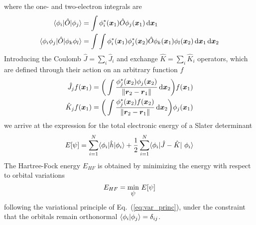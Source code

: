 where the one- and two-electron integrals are
\begin{align}
    \langle \phi_i|\hat{O}|\phi_j \rangle &= \int\phi_i^{\ast}(\boldsymbol x_1)
    \hat{O}\phi_j(\boldsymbol x_1) \,\mathrm{d} \boldsymbol x_1\\
    \langle \phi_i\phi_j|\hat{O}|\phi_k\phi_l \rangle &= \int \int 
    \phi_i^{\ast}(\boldsymbol x_1)\phi_j^{\ast}(\boldsymbol x_2)
    \hat{O}\phi_k(\boldsymbol x_1)\phi_l(\boldsymbol x_2) \,\mathrm{d} \boldsymbol x_1 \,\mathrm{d} \boldsymbol x_2
\end{align}
Introducing the Coulomb $\hat{J}=\sum_i\hat{J}_i$ and exchange $\hat{K}=\sum_i\hat{K}_i$
operators, which are defined through their action on an arbitrary function $f$ 
\begin{align}
    \hat{J}_j f(\boldsymbol x_1) &= \bigg(\int \frac{\phi_j^{\ast}(\boldsymbol x_2)\phi_j(\boldsymbol x_2)}
	{\|\boldsymbol r_2-\boldsymbol r_1\|}\,\mathrm{d}\boldsymbol x_2\bigg) f(\boldsymbol x_1)\\
    \hat{K}_j f(\boldsymbol x_1) &= \bigg(\int \frac{\phi_j^{\ast}(\boldsymbol x_2)f(\boldsymbol x_2)}
	{\|\boldsymbol r_2-\boldsymbol r_1\|}\,\mathrm{d}\boldsymbol x_2\bigg) \phi_j(\boldsymbol x_1)
\end{align}
we arrive at the expression for the total electronic energy of a Slater determinant
\begin{equation}
    E[\wavefunction] = 
    \sum_{i=1}^N \langle \orbital_i |\hat{h}| \orbital_i \rangle +
    \frac{1}{2} \sum_{i=1}^N 
    \langle \orbital_i |\hat{J}-\hat{K}| \orbital_i\rangle
\end{equation}
The Hartree-Fock energy $E_{HF}$ is obtained by minimizing the energy with respect 
to orbital variations
\begin{equation}
    E_{HF} = \mymin{\wavefunction}\ E[\wavefunction]
\end{equation}
following the variational principle of Eq.~(\ref{eq:var_princ}), under the constraint 
that the orbitals remain orthonormal $\langle\phi_i|\phi_j\rangle = \delta_{ij}$.

